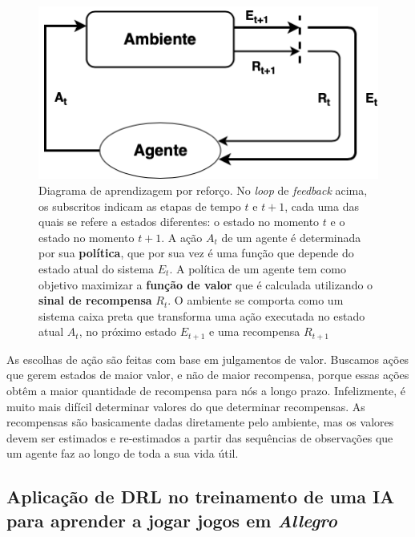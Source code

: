 \begin{figure}[h]
 \centering
 \includegraphics[width=.6 \textwidth]{conteudo/imgs/rl-diagram.png}
 \caption[Diagrama de aprendizagem por reforço]{Diagrama de aprendizagem por reforço. No \textit{loop} de \textit{feedback} acima, os subscritos indicam as etapas de tempo $t$ e $t + 1$, cada uma das quais se refere a estados diferentes: o estado no momento $t$ e o estado no momento $t + 1$. 
 A ação $A_t$ de um agente é determinada por sua \textbf{política}, que por sua vez é uma função que depende do estado atual do sistema $E_t$. A política de um agente tem como objetivo maximizar a \textbf{função de valor} que é calculada utilizando o \textbf{sinal de recompensa} $R_t$. O ambiente se comporta como um sistema caixa preta que transforma uma ação executada no estado atual $A_t$, no próximo estado $E_{t+1}$ e uma recompensa $R_{t+1}$
 }
 \label{rl-diagram}
\end{figure}

As escolhas de ação são feitas com base em julgamentos de valor.
Buscamos ações que gerem estados de maior valor, e não de maior recompensa, porque essas ações obtêm a maior quantidade de recompensa para nós a longo prazo. 
Infelizmente, é muito mais difícil determinar valores do que determinar recompensas. As recompensas são basicamente dadas diretamente pelo ambiente, mas os valores devem ser estimados e re-estimados a partir das sequências de observações que um agente faz ao longo de toda a sua vida útil.


\subsection{Aplicação de DRL no treinamento de uma IA para aprender a jogar jogos em \textit{Allegro}} %
\label{sub:aplicação_de_drl_no_treinamento_de_uma_ia_para_aprender_a_jogar_jogos_em_allegro}

